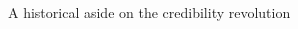 \documentclass[notes,11pt, aspectratio=169]{beamer}
\begin{document}
\begin{frame}{A historical aside on the credibility revolution}
\begin{columns}[T]
\begin{column}{.6\textwidth}
\begin{center}
\end{center}
\end{column}
\end{columns}
\end{frame}
\end{document}

